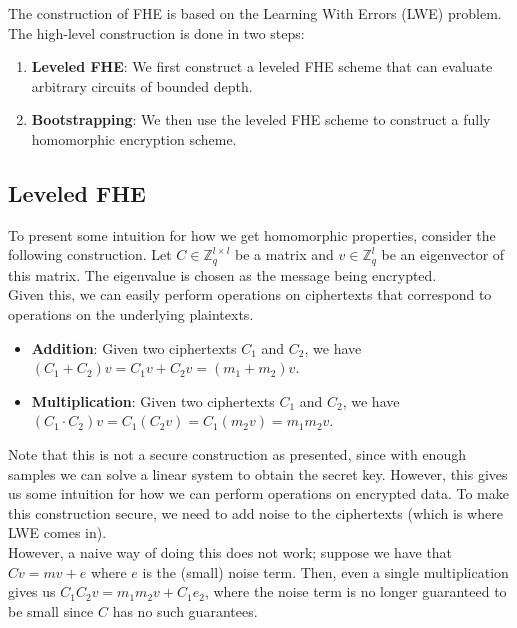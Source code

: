 The construction of FHE is based on the Learning With Errors (LWE) problem. The high-level construction is done in two steps:
\begin{enumerate}
    \item \textbf{Leveled FHE}: We first construct a leveled FHE scheme that can evaluate arbitrary circuits of bounded depth.
    \item \textbf{Bootstrapping}: We then use the leveled FHE scheme to construct a fully homomorphic encryption scheme.
\end{enumerate}

\subsection{Leveled FHE}
To present some intuition for how we get homomorphic properties, consider the following construction. Let $C \in \mathbb{Z}_q^{l \times l}$ be a matrix and $v \in \mathbb{Z}_q^l$ be an eigenvector of this matrix. The eigenvalue is chosen as the message being encrypted. \\
Given this, we can easily perform operations on ciphertexts that correspond to operations on the underlying plaintexts.
\begin{itemize}
    \item \textbf{Addition}: Given two ciphertexts $C_1$ and $C_2$, we have $(C_1 + C_2) v = C_1 v + C_2 v = (m_1 + m_2) v$.
    \item \textbf{Multiplication}: Given two ciphertexts $C_1$ and $C_2$, we have $(C_1 \cdot C_2) v = C_1 (C_2 v) = C_1 (m_2 v) = m_1 m_2 v$.
\end{itemize}
Note that this is not a secure construction as presented, since with enough samples we can solve a linear system to obtain the secret key. However, this gives us some intuition for how we can perform operations on encrypted data. To make this construction secure, we need to add noise to the ciphertexts (which is where LWE comes in). \\
However, a naive way of doing this does not work; suppose we have that $Cv = m v + e$ where $e$ is the (small) noise term. Then, even a single multiplication gives us $C_1 C_2 v = m_1 m_2 v + C_1 e_2$, where the noise term is no longer guaranteed to be small since $C$ has no such guarantees.

